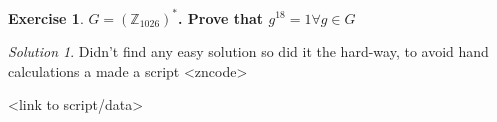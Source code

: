 \documentclass[a4paper,twoside=false,abstract=false,numbers=noenddot,
titlepage=false,headings=small,parskip=half,version=last]{scrartcl}
\theoremstyle{definition}
\newtheorem{exercise}{Exercise}
\theoremstyle{remark}
\newtheorem*{solution}{Solution}
\newcommand{\ZZ}{\ensuremath{\mathbb{Z}}}
\begin{document}
\begin{exercise}
{\bf
$G=(\ZZ_{1026})^*$. Prove that $g^{18}=1 \forall g \in G$
}
\end{exercise}
\begin{solution}

Didn't find any easy solution so did it the hard-way, to avoid hand
calculations a made a script
<zncode>

<link to script/data>
\end{solution}

\end{document}

